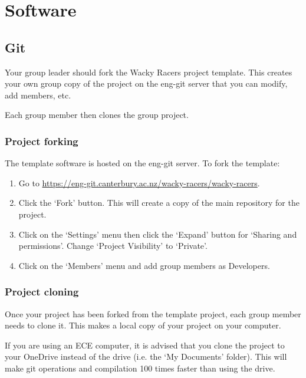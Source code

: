 \chapter{Software}
\label{software}



\section{Git}

Your group leader should fork the Wacky Racers project template.  This
creates your own group copy of the project on the eng-git server that
you can modify, add members, etc.

Each group member then clones the group project.


\subsection{Project forking}
\label{project-forking}

The template software is hosted on the eng-git  server.
To fork the template:

\begin{enumerate}
\item
  Go to \url{https://eng-git.canterbury.ac.nz/wacky-racers/wacky-racers}.
\item
  Click the `Fork' button. This will create a copy of the main repository
  for the project.
\item
  Click on the `Settings' menu then click the `Expand' button for
  `Sharing and permissions'. Change `Project Visibility' to `Private'.
\item
  Click on the `Members' menu and add group members as Developers.
\end{enumerate}


\subsection{Project cloning}
\label{project-cloning}

Once your project has been forked from the template project, each group
member needs to clone it. This makes a local copy of your project on
your computer.

If you are using an ECE computer, it is advised that you clone the
project to your OneDrive instead of the  drive (i.e. the `My
Documents' folder). This will make git operations and compilation
100 times faster than using the  drive.

